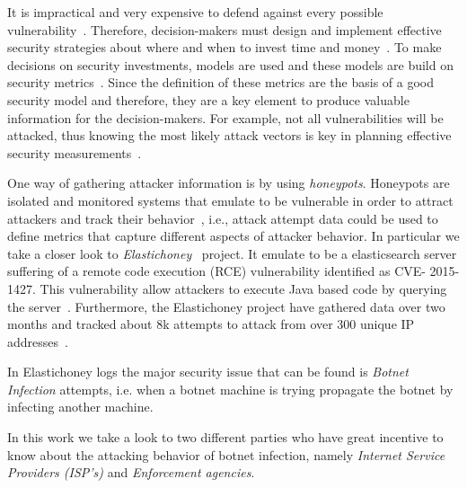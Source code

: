 \label{cap:sec1}

It is impractical and very expensive to defend against every possible vulnerability~\cite{TARA}. Therefore, decision-makers must design and implement effective security strategies about where and when to invest time and money~\cite{ROSI}. To make decisions on security investments, models are used and these models are build on security metrics~\cite{BR2010}. Since the definition of these metrics are the basis of a good security model and therefore, they are a key element to produce valuable information for the decision-makers. For example, not all vulnerabilities will be attacked, thus knowing the most likely attack vectors is key in planning effective security measurements~\cite{TARA}.


One way of gathering attacker information is by using \textit{honeypots}. Honeypots are isolated and monitored systems that emulate to be vulnerable in order to attract attackers and track their behavior~\cite{WP2010}, i.e., attack attempt data could be used to define metrics that capture different aspects of attacker behavior. In particular we take a closer look to \textit{Elastichoney}~\cite{BR2010} project. It emulate to be a elasticsearch server suffering of a remote code execution (RCE) vulnerability identified as CVE- 2015-1427. This vulnerability allow attackers to execute Java based code by querying the server~\cite{CVE}. Furthermore, the Elastichoney project have gathered data over two months and tracked about 8k attempts to attack from over 300 unique IP addresses~\cite{BR2010}.

In Elastichoney logs the major security issue that can be found is \textit{Botnet Infection} attempts, i.e. when a botnet machine is trying propagate the botnet by infecting another machine.

In this work we take a look to two different parties who have great incentive to know about the attacking behavior of botnet infection, namely \textit{Internet Service Providers (ISP's)} and \textit{Enforcement agencies}.

